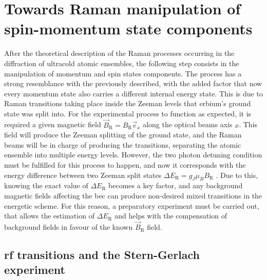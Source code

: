 
\chapter{Towards Raman manipulation of spin-momentum state components}
\label{chap:raman_manipulation}

After the theoretical description of the Raman processes occurring in the diffraction of ultracold atomic ensembles, the following step consists in the manipulation of momentum and spin states components. The process has a strong resemblance with the previously described, with the added factor that now every momentum state also carries a different internal energy state. This is due to Raman transitions taking place inside the Zeeman levels that erbium's ground state was split into. For the experimental process to function as expected, it is required a given magnetic field $\vec{B}_\text{R} = B_{\text{R}} \vec{e}_x$ along the optical beams axis $x$. This field will produce the Zeeman splitting of the ground state, and the Raman beams will be in charge of producing the transitions, separating the atomic ensemble into multiple energy levels. However, the two photon detuning condition must be fulfilled for this process to happen, and now it corresponds with the energy difference between two Zeeman split states $\Delta E_\text{R} = g_J \mu_B B_\text{R}$ \cite{Foot2005}. Due to this, knowing the exact value of $\Delta E_\text{R}$ becomes a key factor, and any background magnetic fields affecting the \ac{bec} can produce non-desired mixed transitions in the energetic scheme. For this reason, a preparatory experiment must be carried out, that allows the estimation of $\Delta E_\text{R}$ and helps with the compensation of background fields in favour of the known $\vec{B}_\text{R}$ field.

\section{\Acl{rf} transitions and the Stern-Gerlach experiment}\label{sec:rf_transitions}

